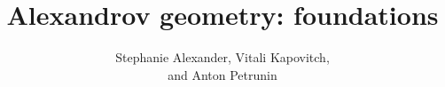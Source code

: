\title{Alexandrov geometry: foundations}
\date{}
\author{Stephanie Alexander, Vitali Kapovitch,\\ and Anton Petrunin}
\maketitle
\thispagestyle{empty}
